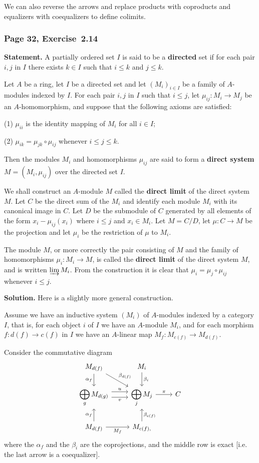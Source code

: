 \documentclass[12pt,letterpaper]{article}%
\newcommand{\ds}{\displaystyle}
\newcommand{\nn}{\noindent}
\begin{document}
We can also reverse the arrows and replace products with coproducts and equalizers with coequalizers to define colimits.

\subsubsection{Page 32, Exercise~2.14}\label{colim}%

\textbf{Statement.} A partially ordered set $I$ is said to be a \textbf{directed} set if for each pair $i,j$ in $I$ there exists $k\in I$ such that $i\le k$ and $j\le k$.

Let $A$ be a ring, let $I$ be a directed set and let $(M_i)_{i\in I}$ be a family of $A$-modules indexed by $I$. For each pair $i,j$ in $I$ such that $i\le j$, let $\mu_{ij}:M_i\to M_j$ be an $A$-homomorphism, and suppose that the following axioms are satisfied:

\nn(1) $\mu_{ii}$ is the identity mapping of $M_i$ for all $i\in I$;

\nn(2) $\mu_{ik}=\mu_{jk}\circ\mu_{ij}$ whenever $i\le j\le k$.

Then the modules $M_i$ and homomorphisms $\mu_{ij}$ are said to form a \textbf{direct system} $M=(M_i,\mu_{ij})$ over the directed set $I$.

We shall construct an $A$-module $M$ called the \textbf{direct limit} of the direct system $M$. Let $C$ be the direct sum of the $M_i$ and identify each module $M_i$ with its canonical image in $C$. Let $D$ be the submodule of $C$ generated by all elements of the form $x_i-\mu_{ij}(x_i)$ where $i\le j$ and $x_i\in M_i$. Let $M=C/D$, let $\mu:C\to M$ be the projection and let $\mu_i$ be the restriction of $\mu$ to $M_i$.

The module $M$, or more correctly the pair consisting of $M$ and the family of homomorphisms $\mu_i:M_i\to M$, is called the \textbf{direct limit} of the direct system $M$, and is written $\varinjlim M_i$. From the construction it is clear that $\mu_i=\mu_j\circ\mu_{ij}$ whenever $i\le j$.

\nn\textbf{Solution.} Here is a slightly more general construction.

Assume we have an inductive system $(M_i)$ of $A$-modules indexed by a category $I$, that is, for each object $i$ of $I$ we have an $A$-module $M_i$, and for each morphism $f:d(f)\to c(f)$ in $I$ we have an $A$-linear map $M_f:M_{c(f)}\to M_{d(f)}$. 

Consider the commutative diagram 
$$
\begin{tikzcd}
M_{d(f)}\ar[d,"\alpha_{f}"']\ar[dr,"\beta_{d(f)}"]&M_i\ar[d,"\beta_i"]\\ 
\ds\bigoplus_gM_{d(g)}\ar[r,yshift=0.9ex,"u"]\ar[r,yshift=-0.9ex,"v"']&\ds\bigoplus_jM_j\ar[r,"\pi"]&C\\ 
M_{d(f)}\ar[u,"\alpha_{f}"]\ar[r,"M_f"']&M_{c(f),}\ar[u,"\beta_{c(f)}"']
\end{tikzcd}
$$ 
where the $\alpha_f$ and the $\beta_i$ are the coprojections, and the middle row is exact [i.e. the last arrow is a coequalizer]. 
\end{document}
